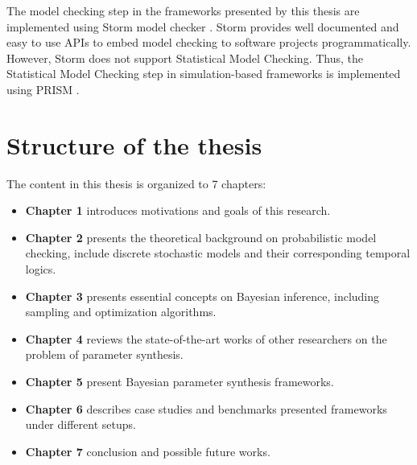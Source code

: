 The model checking step in the frameworks presented by this thesis are implemented using Storm model
checker \cite{hensel2020probabilistic}. Storm provides well documented and easy to use APIs to embed
model checking to software projects programmatically. However, Storm does not support Statistical
Model Checking. Thus, the Statistical Model Checking step in simulation-based frameworks is
implemented using PRISM \cite{kwiatkowska2011prism}.

\section{Structure of the thesis}
The content in this thesis is organized to 7 chapters:
\begin{itemize}
      \item \textbf{Chapter 1} introduces motivations and goals of this research.
      \item \textbf{Chapter 2} presents the theoretical background on probabilistic model checking,
            include discrete stochastic models and their  corresponding temporal logics.
      \item \textbf{Chapter 3} presents essential concepts on Bayesian inference, including sampling
            and optimization algorithms.
      \item \textbf{Chapter 4} reviews the state-of-the-art works of other researchers on the
            problem of parameter synthesis.
      \item \textbf{Chapter 5} present Bayesian parameter synthesis frameworks.
      \item \textbf{Chapter 6} describes case studies and benchmarks presented frameworks under
            different setups.
      \item \textbf{Chapter 7} conclusion and possible future works.
\end{itemize}

